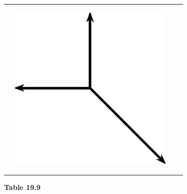 \begin{enumerate}[noitemsep, label=\textbf{\arabic*}. ]
\begin{center}
\begin{xtabular*}{\mytablewidth}[t]{|p{10\mystarwidth}|p{10\mystarwidth}|p{10\mystarwidth}|p{10\mystarwidth}|}
\begin{center}
    \end{center}



    \addtocounter{footnote}{-0}
     &
    
    
        
    \setcounter{subfigure}{0}

\label{m38819*id197143}
    \begin{center}
    \label{m38819*id197143!!!underscore!!!media}\label{m38819*id197143!!!underscore!!!printimage}\includegraphics[width=300px]{col11305.imgs/m38819_PG11C1_076.png} %
        
      \vspace{2pt}
    \vspace{.1in}
    
    \end{center}



    \addtocounter{footnote}{-0}
     \tabularnewline{}
    \end{xtabular*}
      \end{center}
    \begin{center}{\small\bfseries Table 19.9}\end{center}
    

\end{enumerate}
